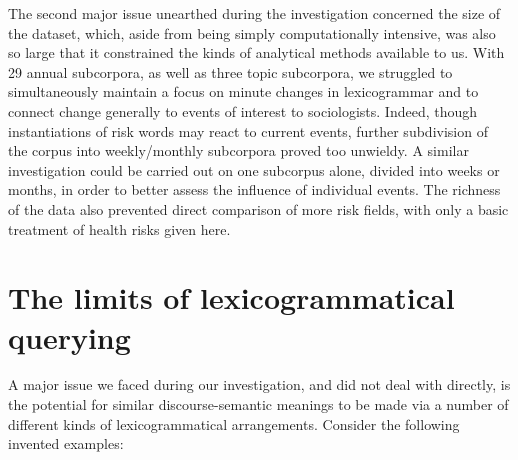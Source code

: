     The second major issue unearthed during the investigation concerned the size of the dataset, which, aside from being simply computationally intensive, was also so large that it constrained the kinds of analytical methods available to us. With 29 annual subcorpora, as well as three topic subcorpora, we struggled to simultaneously maintain a focus on minute changes in lexicogrammar and to connect change generally to events of interest to sociologists. Indeed, though instantiations of risk words may react to current events, further subdivision of the corpus into weekly/monthly subcorpora proved too unwieldy. A similar investigation could be carried out on one subcorpus alone, divided into weeks or months, in order to better assess the influence of individual events. The richness of the data also prevented direct comparison of more risk fields, with only a basic treatment of health risks given here. 

    \section{The limits of lexicogrammatical querying}

        A major issue we faced during our investigation, and did not deal with directly, is the potential for similar discourse-semantic meanings to be made via a number of different kinds of lexicogrammatical arrangements. Consider the following invented examples:

